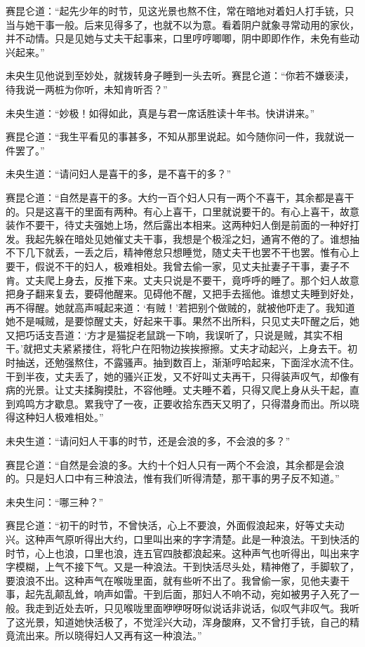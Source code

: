 \documentclass[a4paper,12pt,UTF8,twoside]{ctexbook}
\begin{document}
赛昆仑道：“起先少年的时节，见这光景也熬不住，常在暗地对着妇人打手铳，只当与她干事一般。后来见得多了，也就不以为意。看着阴户就象寻常动用的家伙，并不动情。只是见她与丈夫干起事来，口里哼哼唧唧，阴中即即作作，未免有些动兴起来。”

未央生见他说到至妙处，就拨转身子睡到一头去听。赛昆仑道：“你若不嫌亵渎，待我说一两桩为你听，未知肯听否？”

未央生道：“妙极！如得如此，真是与君一席话胜读十年书。快讲讲来。”

赛昆仑道：“我生平看见的事甚多，不知从那里说起。如今随你问一件，我就说一件罢了。”

未央生道：“请问妇人是喜干的多，是不喜干的多？”

赛昆仑道：“自然是喜干的多。大约一百个妇人只有一两个不喜干，其余都是喜干的。只是这喜干的里面有两种。有心上喜干，口里就说要干的。有心上喜干，故意装作不要干，待丈夫强她上场，然后露出本相来。这两种妇人倒是前面的一种好打发。我起先躲在暗处见她催丈夫干事，我想是个极淫之妇，通宵不倦的了。谁想抽不下几下就丢，一丢之后，精神倦怠只想睡觉，随丈夫干也罢不干也罢。惟有心上要干，假说不干的妇人，极难相处。我曾去偷一家，见丈夫扯妻子干事，妻子不肯。丈夫爬上身去，反推下来。丈夫只说是不要干，竟呼呼的睡了。那个妇人故意把身子翻来复去，要碍他醒来。见碍他不醒，又把手去摇他。谁想丈夫睡到好处，再不得醒。她就高声喊起来道：‘有贼！’若把别个做贼的，就被他吓走了。我知道她不是喊贼，是要惊醒丈夫，好起来干事。果然不出所料，只见丈夫吓醒之后，她又把巧话支吾道：‘方才是猫捉老鼠跳一下响，我误听了，只说是贼，其实不相干。’就把丈夫紧紧搂住，将牝户在阳物边挨挨擦擦。丈夫才动起兴，上身去干。初时抽送，还勉强熬住，不露骚声。抽到数百上，渐渐哼哈起来，下面淫水流不住。干到半夜，丈夫丢了，她的骚兴正发，又不好叫丈夫再干，只得装声叹气，却像有病的光景。让丈夫揉胸摸肚，不容他睡。丈夫睡不着，只得又爬上身从头干起，直到鸡鸣方才歇息。累我守了一夜，正要收拾东西天又明了，只得潜身而出。所以晓得这种妇人极难相处。”

未央生道：“请问妇人干事的时节，还是会浪的多，不会浪的多？”

赛昆仑道：“自然是会浪的多。大约十个妇人只有一两个不会浪，其余都是会浪的。只是妇人口中有三种浪法，惟有我们听得清楚，那干事的男子反不知道。”

未央生问：“哪三种？”

赛昆仑道：“初干的时节，不曾快活，心上不要浪，外面假浪起来，好等丈夫动兴。这种声气原听得出大约，口里叫出来的字字清楚。此是一种浪法。干到快活的时节，心上也浪，口里也浪，连五官四肢都浪起来。这种声气也听得出，叫出来字字模糊，上气不接下气。又是一种浪法。干到快活尽头处，精神倦了，手脚软了，要浪浪不出。这种声气在喉咙里面，就有些听不出了。我曾偷一家，见他夫妻干事，起先乱颠乱耸，响声如雷。干到后面，那妇人不响不动，宛如被男子入死了一般。我走到近处去听，只见喉咙里面咿咿呀呀似说话非说话，似叹气非叹气。我听了这光景，知道她快活极了，不觉淫兴大动，浑身酸麻，又不曾打手铳，自己的精竟流出来。所以晓得妇人又再有这一种浪法。”
\end{document}
